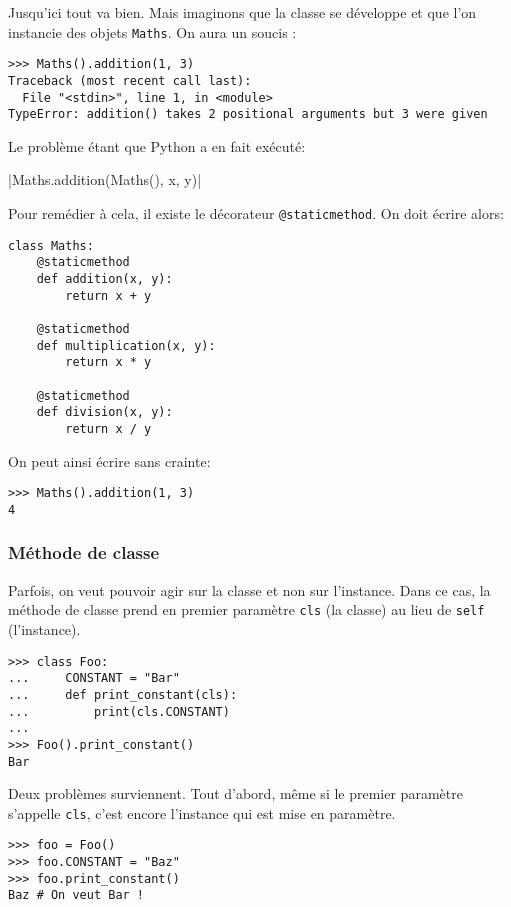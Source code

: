 Jusqu'ici tout va bien. Mais imaginons que la classe se développe et que l'on instancie des objets \texttt{Maths}. On aura un soucis :

\begin{verbatim}
>>> Maths().addition(1, 3)
Traceback (most recent call last):
  File "<stdin>", line 1, in <module>
TypeError: addition() takes 2 positional arguments but 3 were given
\end{verbatim}

Le problème étant que Python a en fait exécuté:

|Maths.addition(Maths(), x, y)|

Pour remédier à cela, il existe le décorateur \texttt{@staticmethod}. On doit écrire alors:

\begin{verbatim}
class Maths:
    @staticmethod
    def addition(x, y):
        return x + y

    @staticmethod
    def multiplication(x, y):
        return x * y

    @staticmethod
    def division(x, y):
        return x / y
\end{verbatim}

On peut ainsi écrire sans crainte:

\begin{verbatim}
>>> Maths().addition(1, 3)
4
\end{verbatim}

\subsubsection{Méthode de classe}
\label{sec:classmethod}

Parfois, on veut pouvoir agir sur la classe et non sur l'instance. Dans ce cas, la méthode de classe prend en premier paramètre \texttt{cls} (la classe) au lieu de \texttt{self} (l'instance).

\begin{verbatim}
>>> class Foo:
...     CONSTANT = "Bar"
...     def print_constant(cls):
...         print(cls.CONSTANT)
...
>>> Foo().print_constant()
Bar
\end{verbatim}

Deux problèmes surviennent. Tout d'abord, même si le premier paramètre s'appelle \texttt{cls}, c'est encore l'instance qui est mise en paramètre.

\begin{verbatim}
>>> foo = Foo()
>>> foo.CONSTANT = "Baz"
>>> foo.print_constant()
Baz # On veut Bar !
\end{verbatim}

